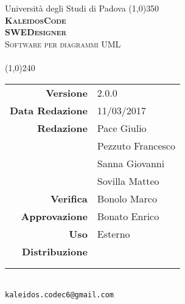 \documentclass[a4paper,12pt]{article}
\author{KaleidosCode}
\date{15/03/2017}	%
\begin{document}
	\begin{titlepage}
		\centering Università degli Studi di Padova
		\line(1,0){350}\\
		\vspace{0.4cm}
		{\bfseries\scshape\LARGE KaleidosCode\\}
		\vspace{0.4cm}
		{\bfseries\scshape\LARGE SWEDesigner\\}
		{\scshape\Large Software per diagrammi UML\\}
		\vspace{1cm}
		{\scshape\Large \analisideirequisitii\ \\}		%
		\vspace{1.4cm}
		\logo
		\vspace{1.2cm}
		\line(1,0){240}\\
		\begin{tabular}{r|l}
			{\hfill \textbf{Versione}} 			& 2.0.0\\
			{\hfill \textbf{Data Redazione}} 	& 11/03/2017\\	%
			{\hfill \textbf{Redazione}} 		& Pace Giulio\\ & Pezzuto Francesco\\ & Sanna Giovanni\\ & Sovilla Matteo\\ 
			{\hfill \textbf{Verifica}} 			& Bonolo Marco\\
			{\hfill \textbf{Approvazione}} 		& Bonato Enrico\\
			{\hfill \textbf{Uso}} 				& Esterno\\
			{\hfill \textbf{Distribuzione}} 	& \vardanega \\ & \cardin \\ & \proponente\\
		\end{tabular}\\
		\vspace{2cm}
		\texttt{kaleidos.codec6@gmail.com}
	\end{titlepage}

	\pagestyle{myfront}
	\newpage
		
	\newpage
		\tableofcontents
	\newpage
		\listoftables
	\newpage
		\listoffigures
	\newpage
	\pagestyle{mymain}
		
	\newpage
		
	\newpage
		
	\newpage
		
	\appendix
	\newpage
		
	\label{LastPage}
\end{document}
